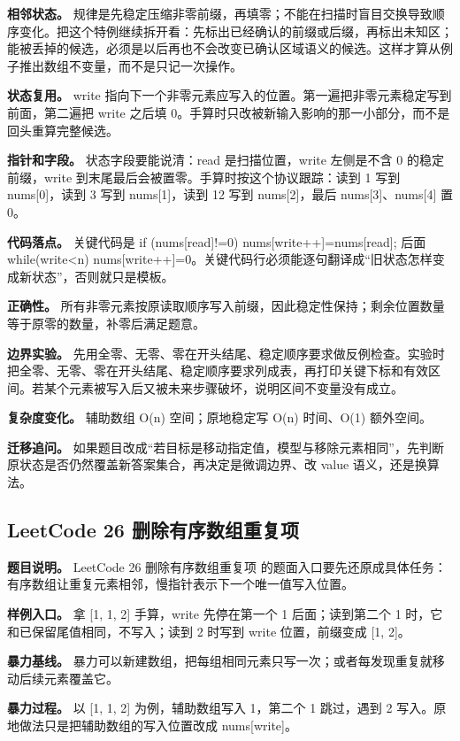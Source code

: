 \textbf{相邻状态。} 规律是先稳定压缩非零前缀，再填零；不能在扫描时盲目交换导致顺序变化。把这个特例继续拆开看：先标出已经确认的前缀或后缀，再标出未知区；能被丢掉的候选，必须是以后再也不会改变已确认区域语义的候选。这样才算从例子推出数组不变量，而不是只记一次操作。

\textbf{状态复用。} write 指向下一个非零元素应写入的位置。第一遍把非零元素稳定写到前面，第二遍把 write 之后填 0。手算时只改被新输入影响的那一小部分，而不是回头重算完整候选。

\textbf{指针和字段。} 状态字段要能说清：read 是扫描位置，write 左侧是不含 0 的稳定前缀，write 到末尾最后会被置零。手算时按这个协议跟踪：读到 1 写到 nums[0]，读到 3 写到 nums[1]，读到 12 写到 nums[2]，最后 nums[3]、nums[4] 置 0。

\textbf{代码落点。} 关键代码是 if (nums[read]!=0) nums[write++]=nums[read]; 后面 while(write<n) nums[write++]=0。关键代码行必须能逐句翻译成“旧状态怎样变成新状态”，否则就只是模板。

\textbf{正确性。} 所有非零元素按原读取顺序写入前缀，因此稳定性保持；剩余位置数量等于原零的数量，补零后满足题意。

\textbf{边界实验。} 先用全零、无零、零在开头结尾、稳定顺序要求做反例检查。实验时把全零、无零、零在开头结尾、稳定顺序要求列成表，再打印关键下标和有效区间。若某个元素被写入后又被未来步骤破坏，说明区间不变量没有成立。

\textbf{复杂度变化。} 辅助数组 O(n) 空间；原地稳定写 O(n) 时间、O(1) 额外空间。

\textbf{迁移追问。} 如果题目改成“若目标是移动指定值，模型与移除元素相同”，先判断原状态是否仍然覆盖新答案集合，再决定是微调边界、改 value 语义，还是换算法。

\subsection{LeetCode 26 删除有序数组重复项}

\textbf{题目说明。} LeetCode 26 删除有序数组重复项 的题面入口要先还原成具体任务：有序数组让重复元素相邻，慢指针表示下一个唯一值写入位置。

\textbf{样例入口。} 拿 [1, 1, 2] 手算，write 先停在第一个 1 后面；读到第二个 1 时，它和已保留尾值相同，不写入；读到 2 时写到 write 位置，前缀变成 [1, 2]。

\textbf{暴力基线。} 暴力可以新建数组，把每组相同元素只写一次；或者每发现重复就移动后续元素覆盖它。

\textbf{暴力过程。} 以 [1, 1, 2] 为例，辅助数组写入 1，第二个 1 跳过，遇到 2 写入。原地做法只是把辅助数组的写入位置改成 nums[write]。

